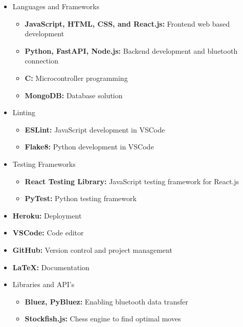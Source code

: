 \documentclass{article}
\begin{document}
\begin{itemize}
\item Languages and Frameworks
\begin{itemize}
    \item \textbf{JavaScript, HTML, CSS, and React.js:} Frontend web based development
    \item \textbf{Python, FastAPI, Node.js:} Backend development and bluetooth connection
    \item \textbf{C:} Microcontroller programming
    \item \textbf{MongoDB:} Database solution
\end{itemize}

\item Linting
\begin{itemize}
    \item \textbf{ESLint:} JavaScript development in VSCode
    \item \textbf{Flake8:} Python development in VSCode
\end{itemize} 

\item Testing Frameworks
\begin{itemize}
    \item \textbf{React Testing Library:} JavaScript testing framework for React.js
    \item \textbf{PyTest:} Python testing framework
\end{itemize}

\item \textbf{Heroku:} Deployment

\item \textbf{VSCode:} Code editor

\item \textbf{GitHub:} Version control and project management

\item \textbf{LaTeX:} Documentation

\item Libraries and API's
\begin{itemize}
    \item \textbf{Bluez, PyBluez:} Enabling bluetooth data transfer
    \item \textbf{Stockfish.js:} Chess engine to find optimal moves
\end{itemize}


\end{itemize}
\end{document}
